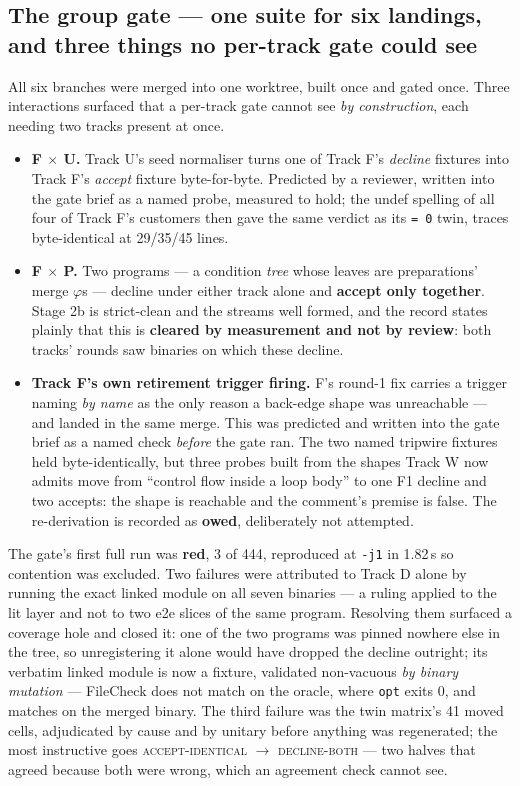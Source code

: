 \subsection*{The group gate --- one suite for six landings, and three things no per-track gate could see}
All six branches were merged into one worktree, built once and gated once. Three interactions surfaced that
a per-track gate cannot see \emph{by construction}, each needing two tracks present at once.
\begin{itemize}
  \item \textbf{F \(\times\) U.} Track U's seed normaliser turns one of Track F's \emph{decline} fixtures
    into Track F's \emph{accept} fixture byte-for-byte. Predicted by a reviewer, written into the gate brief
    as a named probe, measured to hold; the undef spelling of all four of Track F's customers then gave the
    same verdict as its \texttt{= 0} twin, traces byte-identical at 29/35/45 lines.
  \item \textbf{F \(\times\) P.} Two programs --- a condition \emph{tree} whose leaves are preparations'
    merge \(\varphi\)s --- decline under either track alone and \textbf{accept only together}. Stage 2b is
    strict-clean and the streams well formed, and the record states plainly that this is \textbf{cleared by
    measurement and not by review}: both tracks' rounds saw binaries on which these decline.
  \item \textbf{Track F's own retirement trigger firing.} F's round-1 fix carries a trigger naming
     \emph{by name} as the only reason a back-edge shape was unreachable --- and  landed
    in the same merge. This was predicted and written into the gate brief as a named check \emph{before} the
    gate ran. The two named tripwire fixtures held byte-identically, but three probes built from the shapes
    Track W now admits move from ``control flow inside a loop body'' to one F1 decline and two accepts: the
    shape is reachable and the comment's premise is false. The re-derivation is recorded as \textbf{owed},
    deliberately not attempted.
\end{itemize}
The gate's first full run was \textbf{red}, 3 of 444, reproduced at \texttt{-j1} in 1.82\,s so contention was
excluded. Two failures were attributed to Track D alone by running the exact linked module on all seven
binaries --- a ruling applied to the lit layer and not to two e2e slices of the same program. Resolving them
surfaced a coverage hole and closed it: one of the two programs was pinned nowhere else in the tree, so
unregistering it alone would have dropped the decline outright; its verbatim linked module is now a fixture,
validated non-vacuous \emph{by binary mutation} --- FileCheck does not match on the oracle, where
\texttt{opt} exits 0, and matches on the merged binary. The third failure was the twin matrix's 41 moved
cells, adjudicated by cause and by unitary before anything was regenerated; the most instructive goes
\textsc{accept-identical} \(\to\) \textsc{decline-both} --- two halves that agreed because both were wrong,
which an agreement check cannot see.


